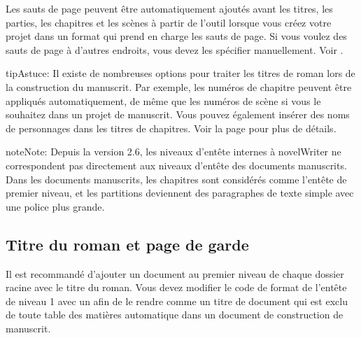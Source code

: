 \documentclass[a4paper,11pt,french]{sphinxmanual}
\begin{document}
\sphinxAtStartPar
Les sauts de page peuvent être automatiquement ajoutés avant les titres, les parties, les chapitres et les scènes à partir de l’outil  lorsque vous créez votre projet dans un format qui prend en charge les sauts de page. Si vous voulez des sauts de page à d’autres endroits, vous devez les spécifier manuellement. Voir {\hyperref[\detokenize{usage_format:a-fmt-break}]{}}.

\begin{sphinxadmonition}{tip}{Astuce:}
\sphinxAtStartPar
Il existe de nombreuses options pour traiter les titres de roman lors de la construction du manuscrit. Par exemple, les numéros de chapitre peuvent être appliqués automatiquement, de même que les numéros de scène si vous le souhaitez dans un projet de manuscrit. Vous pouvez également insérer des noms de personnages dans les titres de chapitres. Voir la page {\hyperref[\detokenize{project_manuscript:a-manuscript}]{}} pour plus de détails.
\end{sphinxadmonition}

\begin{sphinxadmonition}{note}{Note:}
\sphinxAtStartPar
Depuis la version 2.6, les niveaux d’en\sphinxhyphen{}tête internes à novelWriter ne correspondent pas directement aux niveaux d’en\sphinxhyphen{}tête des documents manuscrits. Dans les documents manuscrits, les chapitres sont considérés comme l’en\sphinxhyphen{}tête de premier niveau, et les partitions deviennent des paragraphes de texte simple avec une police plus grande.

\sphinxAtStartPar
{}
\end{sphinxadmonition}


\subsection{Titre du roman et page de garde}
\label{\detokenize{project_structure:novel-title-and-front-matter}}\label{\detokenize{project_structure:a-struct-heads-title}}
\sphinxAtStartPar
Il est recommandé d’ajouter un document au premier niveau de chaque dossier racine  avec le titre du roman. Vous devez modifier le code de format de l’en\sphinxhyphen{}tête de niveau 1 avec un \sphinxcode{\sphinxupquote{!}} afin de le rendre comme un titre de document qui est exclu de toute table des matières automatique dans un document de construction de manuscrit.
\end{document}
